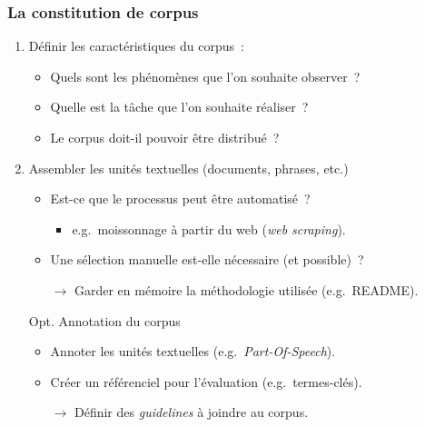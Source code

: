\begin{frame}
\frametitle{La constitution de corpus}

\begin{enumerate}\itemsep10pt

    \item Définir les caractéristiques du corpus~:
    \begin{itemize}
        \item Quels sont les phénomènes que l'on souhaite observer~?
        \item Quelle est la tâche que l'on souhaite réaliser~?
        \item Le corpus doit-il pouvoir être distribué~?
    \end{itemize} 

    \item Assembler les unités textuelles (documents, phrases, etc.)
    \begin{itemize}
        \item Est-ce que le processus peut être automatisé~?
        \begin{itemize}
            \item e.g.~moissonnage à partir du web (\textit{web scraping}).
        \end{itemize}
        \item Une sélection manuelle est-elle nécessaire (et possible)~?
        \item[$\to$] Garder en mémoire la méthodologie utilisée (e.g.~README).
    \end{itemize}

    \item[Opt.] Annotation du corpus
    \begin{itemize}
        \item Annoter les unités textuelles (e.g.~\textit{Part-Of-Speech}).
        \item Créer un référenciel pour l'évaluation (e.g.~termes-clés).
        \item[$\to$] Définir des \textit{guidelines} à joindre au corpus.
    \end{itemize}

\end{enumerate}

\end{frame}

